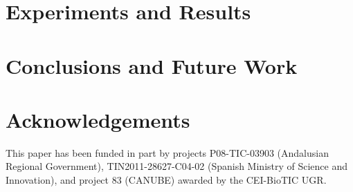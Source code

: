 \documentclass{llncs}
\begin{document}
%
\section{Experiments and Results}
\label{sec:experiments}


%
\section{Conclusions and Future Work}
\label{sec:conclusions}




\section*{Acknowledgements}

This paper has been funded in part by projects P08-TIC-03903 (Andalusian Regional Government), TIN2011-28627-C04-02 (Spanish Ministry of Science and Innovation), and project 83 (CANUBE) awarded by the CEI-BioTIC UGR.



\end{document}
